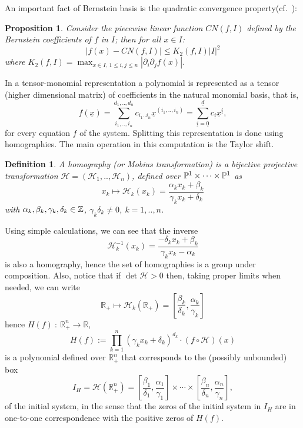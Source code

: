 \documentclass{sig-alternate}
\newtheorem{proposition}[theorem]{Proposition}
\newtheorem{definition}[theorem]{Definition}\newtheorem{dxample}[theorem]{Example}
\newcommand{\ds}{\displaystyle}
\newcommand{\dott}{{..}}
\def\RR{\mathbb{R}}
\newcommand{\uvec}[1]{\underline{#1}}
\begin{document}
An important fact of Bernstein basis is the quadratic convergence property(cf.~\cite[Theorem~2.1]{reif-2000}):

\begin{proposition} \label{quad_convergence}
Consider the piecewise linear function $CN(f,I)$ defined by the Bernstein coefficients of $f$ in $I$; then for all $x\in I$:
$$
|  f(x) - CN(f,I) | \leq   K_2(f,I) |I|^2
$$
where $K_2(f,I)=\max_{x\in I,\, 1\leq i,j\leq n }| \partial_i\partial_j f(x)|$.  \end{proposition}
\fi

In a tensor-monomial representation a polynomial is represented as a
tensor (higher dimensional matrix) of coefficients in the natural
monomial basis, that is,
$$
f(\uvec x)= \sum_{i_1,\dott,i_n}^{d_1,\dott,d_n} c_{i_1\dott i_n} \uvec x^{(i_1,\dott,i_n)} = \sum_{\uvec i=\uvec 0}^{\uvec d} c_{\uvec i} \uvec x^{\uvec i} ,
$$
for every equation $f$ of the system.  Splitting this
representation is done using homographies. The main operation in this
computation is the Taylor shift.

\begin{definition}
  A homography (or Mobius transformation) is a bijective projective
  transformation $\mathcal H = (\mathcal H_1,\dott,\mathcal H_n)$,
  defined over ${\mathbb P}^1\times\cdots\times {\mathbb P}^1$ as
$$ 
x_k \mapsto \mathcal H_k(x_k)= \frac{\alpha_k x_k + \beta_k}{ \gamma_k x_k + \delta_k } 
$$ 
with $\alpha_k,\beta_k,\gamma_k,\delta_k \in {\mathbb Z}$, $\gamma_k \delta_k\ne 0 $, $k=1,\dott,n$. 
\end{definition}
Using simple calculations, we can see that the inverse
$$\ds \mathcal H_k^{-1}(x_k)= \frac{-\delta_k x_k + \beta_k}{ \gamma_k x_k - \alpha_k } 
$$
is also a homography, hence the set of homographies is a group under
composition.  Also, notice that if $\det \mathcal H>0$ then, taking
proper limits when needed, we can write
\begin{equation}\label{inverse_hg}
\RR_+  \mapsto \mathcal H_k( \RR_+ )=  \left[ \frac{\beta_k}{\delta_k},  \frac{\alpha_k}{\gamma_k}\right]
\end{equation}
hence $ H(f)\ : \ \RR^n_+ \to \RR $, 
$$
H(f) :=\prod_{k=1}^n(\gamma_kx_k
+ \delta_k)^{d_k} \cdot (f\circ \mathcal H) (x) 
$$
is a polynomial defined
over $\RR^n_{+}$ that corresponds to the (possibly unbounded) box 
\begin{equation}\label{Hbox}
I_H = \mathcal H( \RR_+^n) = 
\left[ \frac{\beta_1}{\delta_1},  \frac{\alpha_1}{\gamma_1}\right]
\times \cdots\times 
\left[ \frac{\beta_n}{\delta_n},  \frac{\alpha_n}{\gamma_n}\right]  ,
\end{equation}
of the initial system, in the sense that the zeros of the initial
system in $I_H$ are in one-to-one correspondence with the positive
zeros of $H(f)$.
\end{document}
